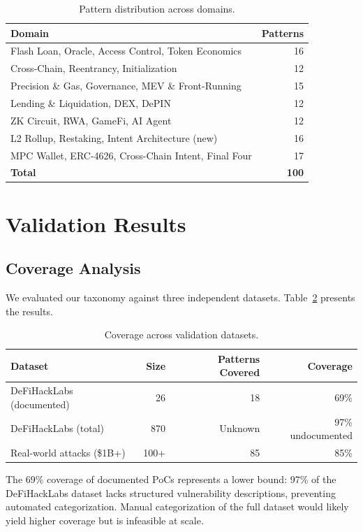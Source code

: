 \documentclass[runningheads]{llncs}
\begin{document}
\begin{table}[h]
\centering
\caption{Pattern distribution across domains.}
\label{tab:domains}
\begin{tabular}{lr}
\toprule
Domain & Patterns \\
\midrule
Flash Loan, Oracle, Access Control, Token Economics & 16 \\
Cross-Chain, Reentrancy, Initialization & 12 \\
Precision \& Gas, Governance, MEV \& Front-Running & 15 \\
Lending \& Liquidation, DEX, DePIN & 12 \\
ZK Circuit, RWA, GameFi, AI Agent & 12 \\
L2 Rollup, Restaking, Intent Architecture (new) & 16 \\
MPC Wallet, ERC-4626, Cross-Chain Intent, Final Four & 17 \\
\midrule
\textbf{Total} & \textbf{100} \\
\bottomrule
\end{tabular}
\end{table}

\section{Validation Results}

\subsection{Coverage Analysis}

We evaluated our taxonomy against three independent datasets. Table~\ref{tab:coverage} presents the results.

\begin{table}[h]
\centering
\caption{Coverage across validation datasets.}
\label{tab:coverage}
\begin{tabular}{lrrr}
\toprule
Dataset & Size & Patterns Covered & Coverage \\
\midrule
DeFiHackLabs (documented) & 26 & 18 & 69\% \\
DeFiHackLabs (total) & 870 & Unknown & 97\% undocumented \\
Real-world attacks (\$1B+) & 100+ & 85 & 85\% \\
\bottomrule
\end{tabular}
\end{table}

The 69\% coverage of documented PoCs represents a lower bound: 97\% of the DeFiHackLabs dataset lacks structured vulnerability descriptions, preventing automated categorization. Manual categorization of the full dataset would likely yield higher coverage but is infeasible at scale.
\end{document}
